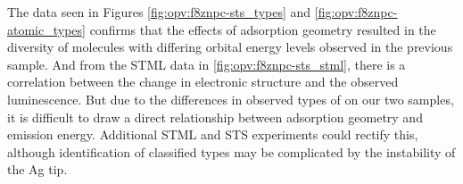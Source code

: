 





The data seen in Figures \ref{fig:opv:f8znpc-sts_types} and \ref{fig:opv:f8znpc-atomic_types} confirms that the effects of adsorption geometry resulted in the diversity of molecules with differing orbital energy levels observed in the previous sample. And from the \ac{STML} data in \autoref{fig:opv:f8znpc-sts_stml}, there is a correlation between the change in electronic structure and the observed luminescence. But due to the differences in observed types of  on our two samples, it is difficult to draw a direct relationship between adsorption geometry and emission energy. Additional \ac{STML} and \ac{STS} experiments could rectify this, although identification of classified types may be complicated by the instability of the Ag tip.



